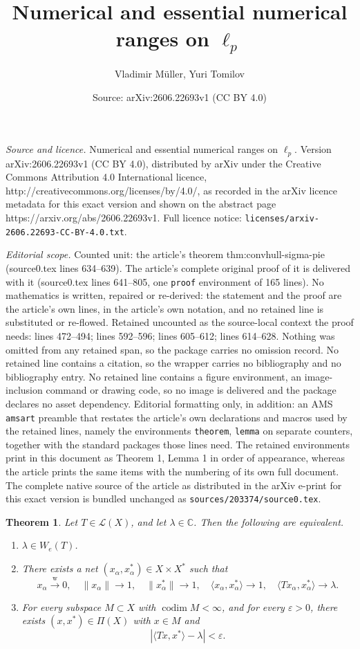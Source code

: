 \documentclass[10pt,a4paper]{amsart}
\title{Numerical and essential numerical ranges on $\ell_p$}
\author{Vladimir M\"uller, Yuri Tomilov}
\date{Source: arXiv:2606.22693v1 (CC BY 4.0)}
\newtheorem{theorem}{Theorem}
\newcommand{\C}{\mathbb{C}}
\newcommand{\We}{W_e}
\DeclareMathOperator{\codim}{codim}
\newcommand{\e}{\varepsilon}
\newcommand{\ip}[2]{\langle #1,#2\rangle}
\newcommand{\wto}{\xrightarrow{\mathrm w}}
\begin{document}
\maketitle

\noindent\emph{Source and licence.} Numerical and essential numerical ranges on $\ell_p$. Version arXiv:2606.22693v1 (CC BY 4.0), distributed by arXiv under the Creative Commons Attribution 4.0 International licence, http://creativecommons.org/licenses/by/4.0/, as recorded in the arXiv licence metadata for this exact version and shown on the abstract page https://arxiv.org/abs/2606.22693v1. Full licence notice: \texttt{licenses/arxiv-2606.22693-CC-BY-4.0.txt}.\par\smallskip

\noindent\textit{Editorial scope.} Counted unit: the article's theorem thm:convhull-sigma-pie (source0.tex lines 634--639). The article's complete original proof of it is delivered with it (source0.tex lines 641--805, one \texttt{proof} environment of 165 lines). No mathematics is written, repaired or re-derived: the statement and the proof are the article's own lines, in the article's own notation, and no retained line is substituted or re-flowed.  Retained uncounted as the source-local context the proof needs: lines 472--494; lines 592--596; lines 605--612; lines 614--628.  Nothing was omitted from any retained span, so the package carries no omission record.  No retained line contains a citation, so the wrapper carries no bibliography and no bibliography entry.  No retained line contains a figure environment, an image-inclusion command or drawing code, so no image is delivered and the package declares no asset dependency.  Editorial formatting only, in addition: an AMS \texttt{amsart} preamble that restates the article's own declarations and macros used by the retained lines, namely the environments \texttt{theorem}, \texttt{lemma} on separate counters, together with the standard packages those lines need.  The retained environments print in this document as Theorem 1, Lemma 1 in order of appearance, whereas the article prints the same items with the numbering of its own full document.  The complete native source of the article as distributed in the arXiv e-print for this exact version is bundled unchanged as \texttt{sources/203374/source0.tex}.
\begin{theorem}\label{thm:characterization-We}
 Let $T\in \mathcal L(X)$, and let $\lambda\in\C$. Then the following are equivalent.
\begin{enumerate}[label=\textup{(\roman*)}]
\item $\lambda\in\We(T)$.
\item There exists a net $(x_\alpha,x^*_\alpha)\in X\times X^*$ such that
\[
x_\alpha\wto 0,
\quad
\|x_\alpha\|\to 1,
\quad
\|x_\alpha^*\|\to 1,
\quad
\ip{x_\alpha}{x_\alpha^*}\to 1,
\quad
\ip{Tx_\alpha}{x_\alpha^*}\to \lambda.
\]
\item For every subspace $M\subset X$ with $\codim M<\infty$, and for every $\e>0$, there exists $(x,x^*)\in\Pi(X)$ with $x\in M$ and
\[
|\ip{Tx}{x^*}-\lambda|<\e.
\]
\end{enumerate}
\end{theorem}
\end{document}
